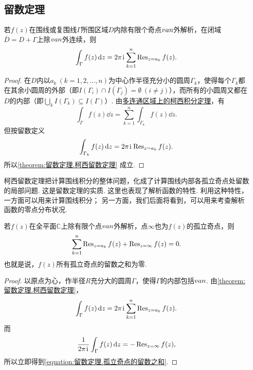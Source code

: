 \subsection{留数定理}
\begin{theorem}[柯西留数定理]\label{theorem:留数定理.柯西留数定理}
若\(f(z)\)在围线或复围线\(\Gamma\)所围区域\(D\)内除有限个奇点\(v{a}{n}\)外解析，在闭域\(\overline{D}=D+\Gamma\)上除\(v{a}{n}\)外连续，则\begin{equation}\label{equation:留数定理.柯西留数定理}
\int_{\Gamma} f(z) \dd{z}
= 2\pi\kern1pt\mathrm{i}\kern1pt \sum\limits_{k=1}^n \operatorname{Res}_{z=a_k} f(z).
\end{equation}
\begin{proof}
在\(D\)内以\(a_k\ (k=1,2,\dotsc,n)\)为中心作半径充分小的圆周\(\Gamma_k\)，使得每个\(\Gamma_k\)都在其余小圆周的外部（即\(I(\Gamma_i) \cap I(\Gamma_j) = \emptyset\ (i \neq j)\)），而所有的小圆周又都在\(D\)的内部（即\(\bigcup_k I(\Gamma_k) \subseteq I(\Gamma)\)）.
由\hyperref[theorem:解析函数的积分表示.多连通区域的柯西积分定理]{多连通区域上的柯西积分定理}，有\[
\int_{\Gamma} f(z) \dd{z}
= \sum\limits_{k=1}^n \int_{\Gamma_k} f(z) \dd{z}.
\]但按留数定义\[
\int_{\Gamma_k} f(z) \dd{z} = 2\pi\kern1pt\mathrm{i}\kern1pt \operatorname{Res}_{z=a_k} f(z).
\]所以\cref{theorem:留数定理.柯西留数定理} 成立.
\end{proof}
\end{theorem}
柯西留数定理把计算围线积分的整体问题，化成了计算围线内部各孤立奇点处留数的局部问题.
这是留数定理的实质.
这里也表现了解析函数的特性.
利用这种特性，一方面可以用来计算围线积分；
另一方面，我们后面将看到，可以用来考查解析函数的零点分布状况.

\begin{theorem}\label{theorem:留数定理.孤立奇点的留数之和}
若\(f(z)\)在全平面\(\mathbb{C}\)上除有限个点\(v{a}{n}\)外解析，点\(\infty\)也为\(f(z)\)的孤立奇点，则\begin{equation}\label{equation:留数定理.孤立奇点的留数之和}
\sum\limits_{k=1}^n \operatorname{Res}_{z=a_k} f(z) + \operatorname{Res}_{z=\infty} f(z) = 0.
\end{equation}也就是说，\(f(z)\)所有孤立奇点的留数之和为零.
\begin{proof}
以原点为心，作半径\(R\)充分大的圆周\(\Gamma\)，使得\(\Gamma\)的内部包括\(v{a}{n}\).
由\cref{theorem:留数定理.柯西留数定理}，\[
\int_{\Gamma} f(z) \dd{z}
= 2\pi\kern1pt\mathrm{i}\kern1pt \sum\limits_{k=1}^n \operatorname{Res}_{z=a_k} f(z).
\]而\[
\frac{1}{2\pi\kern1pt\mathrm{i}\kern1pt} \int_{\Gamma} f(z) \dd{z}
= -\operatorname{Res}_{z=\infty} f(z),
\]所以立即得到\cref{equation:留数定理.孤立奇点的留数之和}.
\end{proof}
\end{theorem}

